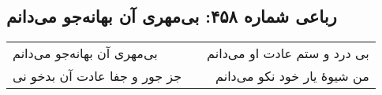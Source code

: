 \begin{center}
\section*{رباعی شماره ۴۵۸: بی‌مهری آن بهانه‌جو می‌دانم}
\label{sec:sh458}
\begin{longtable}{l p{0.5cm} r}
بی‌مهری آن بهانه‌جو می‌دانم
&&
بی درد و ستم عادت او می‌دانم
\\
جز جور و جفا عادت آن بدخو نی
&&
من شیوهٔ یار خود نکو می‌دانم
\\
\end{longtable}
\end{center}
